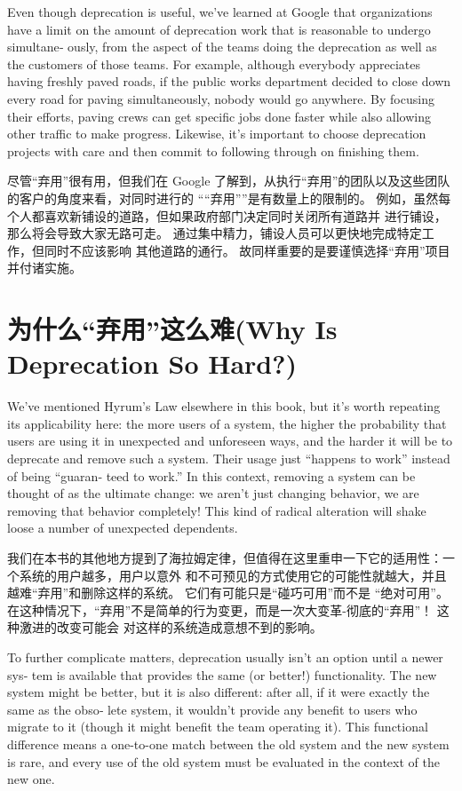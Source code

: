 \documentclass[10pt,a4paper,UTF8]{ctexart}
\begin{document}
Even though deprecation is useful, we’ve learned at Google that organizations have a limit on the
amount of deprecation work that is reasonable to undergo simultane‐ ously, from the aspect of the
teams doing the deprecation as well as the customers of those teams. For example, although everybody
appreciates having freshly paved roads, if the public works department decided to close down every
road for paving simultaneously, nobody would go anywhere. By focusing their efforts, paving crews
can get specific jobs done faster while also allowing other traffic to make progress. Likewise, it’s
important to choose deprecation projects with care and then commit to following through on finishing
them.

尽管“弃用”很有用，但我们在 Google 了解到，从执行“弃用”的团队以及这些团队的客户的角度来看，对同时进行的
““弃用””是有数量上的限制的。 例如，虽然每个人都喜欢新铺设的道路，但如果政府部门决定同时关闭所有道路并
进行铺设，那么将会导致大家无路可走。 通过集中精力，铺设人员可以更快地完成特定工作，但同时不应该影响
其他道路的通行。 故同样重要的是要谨慎选择“弃用”项目并付诸实施。

\section{为什么“弃用”这么难(Why Is Deprecation So Hard?)}
\label{sec:orgd0e8885}

We’ve mentioned Hyrum’s Law elsewhere in this book, but it’s worth repeating its applicability here:
the more users of a system, the higher the probability that users are using it in unexpected and
unforeseen ways, and the harder it will be to deprecate and remove such a system. Their usage just
“happens to work” instead of being “guaran‐ teed to work.” In this context, removing a system can be
thought of as the ultimate change: we aren’t just changing behavior, we are removing that behavior
completely! This kind of radical alteration will shake loose a number of unexpected dependents.

我们在本书的其他地方提到了海拉姆定律，但值得在这里重申一下它的适用性：一个系统的用户越多，用户以意外
和不可预见的方式使用它的可能性就越大，并且越难“弃用”和删除这样的系统。 它们有可能只是“碰巧可用”而不是
“绝对可用”。 在这种情况下，“弃用”不是简单的行为变更，而是一次大变革-彻底的“弃用”！ 这种激进的改变可能会
对这样的系统造成意想不到的影响。

To further complicate matters, deprecation usually isn’t an option until a newer sys‐ tem is
available that provides the same (or better!) functionality. The new system might be better, but it
is also different: after all, if it were exactly the same as the obso‐ lete system, it wouldn’t
provide any benefit to users who migrate to it (though it might benefit the team operating it). This
functional difference means a one-to-one match between the old system and the new system is rare,
and every use of the old system must be evaluated in the context of the new one.
\end{document}
